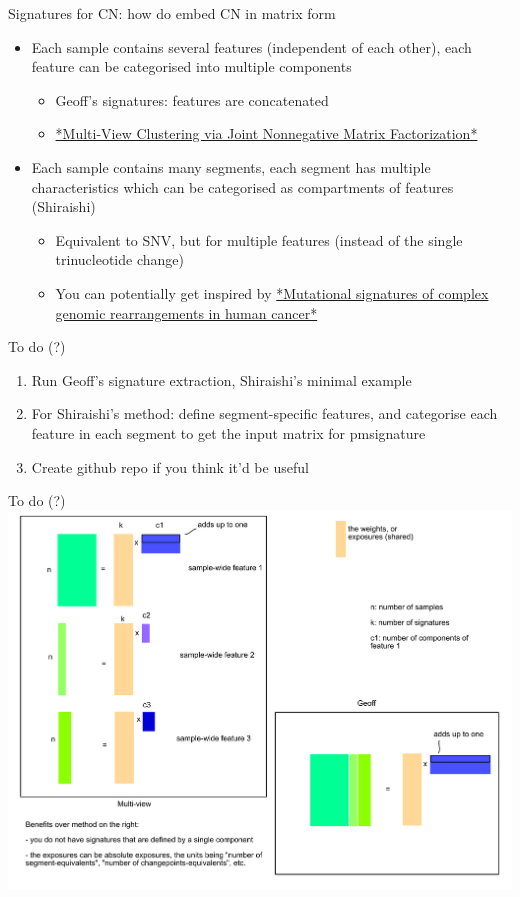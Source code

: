 \documentclass{beamer}
\begin{document}
\begin{frame}{Signatures for CN: how do embed CN in matrix form}

\begin{itemize}
\item Each sample contains several features (independent of each other), each feature can be categorised into multiple components
	\begin{itemize}
	\item Geoff's signatures: features are concatenated
	\item \href{https://epubs.siam.org/doi/abs/10.1137/1.9781611972832.28?mobileUi=0}{*Multi-View Clustering via Joint Nonnegative Matrix Factorization*}
	\end{itemize}
\item Each sample contains many segments, each segment has multiple characteristics which can be categorised as compartments of features (Shiraishi)
	\begin{itemize}
	\item Equivalent to SNV, but for multiple features (instead of the single trinucleotide change)
	\item You can potentially get inspired by \href{https://www.biorxiv.org/content/10.1101/2021.05.16.444385v1}{*Mutational signatures of complex genomic rearrangements in human cancer*}
	\end{itemize}
\end{itemize}

\end{frame}

\begin{frame}{To do (?)}
\begin{enumerate}
\item Run Geoff's signature extraction, Shiraishi's minimal example
\item For Shiraishi's method: define segment-specific features, and categorise each feature in each segment to get the input matrix for pmsignature
\item Create github repo if you think it'd be useful
\end{enumerate}
\end{frame}

\begin{frame}{To do (?)}
\includegraphics[width=\textwidth]{../../figures/joint_nmf}

\end{frame}
\end{document}
